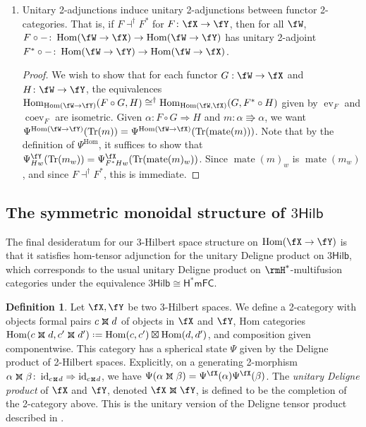 \documentclass[12pt, reqno]{amsart}
\DeclareMathOperator{\coev}{coev}
\DeclareMathOperator{\ev}{ev}
\DeclareMathOperator{\Hom}{Hom}
\DeclareMathOperator{\id}{id}
\DeclareMathOperator{\mate}{mate}
\DeclareMathOperator{\Tr}{Tr}
\newcommand{\Hilb}{\mathsf{Hilb}}
\theoremstyle{plain}
\theoremstyle{definition}
\newtheorem{defn}[thm]{Definition}
\newcommand{\coloneq}{:=}
\def\coloneq{\mathrel{\vcenter{\baselineskip0.55ex\lineskiplimit0pt\hbox{\upshape.}\hbox{\upshape.}}}=}
\newcommand{\dtimesaux}[4]{\mathbin{\vcenter{\hbox{\raisebox{#4}{\scalebox{#3}{\ooalign{\hfil$\vcenter{\hbox{$#1\times$}}$\hfil\cr\hfil$\vcenter{\hbox{\mbox{#2\upshape\wasylozenge}}}$\hfil\cr}}}}}}}
\newcommand{\dtimes}{%
  \mathchoice
    {\dtimesaux{\displaystyle}{\normalsize}{1.15}{0.35ex}}
    {\dtimesaux{\textstyle}{\normalsize}{1.15}{0.35ex}}
    {\dtimesaux{\scriptstyle}{\scriptsize}{1.0}{0ex}}
    {\dtimesaux{\scriptscriptstyle}{\tiny}{1.0}{0ex}}%
}
\newcommand{\threehilbtimes}{\dtimes}
\begin{document}
\begin{enumerate}[label=(D\arabic*)]
    \item 
    \label{D:YonedaEmbeddingUAF}
    Unitary 2-adjunctions induce unitary 2-adjunctions between functor 2-categories.
That is, if $F\dashv^\dag F^*$ for $F\colon  \fX\to \fY$, then for all $\fW$, 
$F\circ - \colon  \Hom(\fW\to \fX) \to \Hom(\fW\to \fY)$ 
has unitary 2-adjoint $F^*\circ -\colon  \Hom(\fW\to \fY)\to \Hom(\fW\to \fX)$.
\begin{proof}
We wish to show that for each functor $G:\fW \to \fX$ and $H\colon\fW \to \fY$, the equivalences $\Hom_{\Hom(\fW\to\fY)}(F\circ G,H) \cong^\dag \Hom_{\Hom(\fW,\fX)}(G,F^*\circ H)$ given by $\ev_F$ and $\coev_F$ are isometric.
Given $\alpha\colon F\circ G\Rightarrow H$ and $m\colon\alpha \Rrightarrow \alpha$, we want $\Psi^{\Hom(\fW\to\fY)}(\Tr(m)) = \Psi^{\Hom(\fW\to\fX)}(\Tr(\mate(m)))$.
Note that by the definition of $\Psi^{\Hom}$, it suffices to show that $\Psi^\fY_{Hw}(\Tr(m_w)) = \Psi^{\fX}_{F^* Hw}(\Tr(\mate(m)_w))$.
Since $\mate(m)_w$ is $\mate(m_w)$, and since $F \dashv^\dag F^*$, this is immediate.
\end{proof}
\end{enumerate}


\subsection{The symmetric monoidal structure of \texorpdfstring{$3\Hilb$}{3Hilb}}\label{sec:symm-monoidal-struct}
The final desideratum for our 3-Hilbert space structure on $\Hom(\fX\to \fY)$ is that it satisfies hom-tensor adjunction for the unitary Deligne product on $3\Hilb$, which corresponds to the usual unitary Deligne product on $\rmH^*$-multifusion categories under the equivalence $3\Hilb \cong \mathsf{H^*mFC}$.

    \begin{defn}
    Let $\fX,\fY$ be two 3-Hilbert spaces.
    We define a 2-category with objects formal pairs $c\threehilbtimes d$ of objects in $\fX$ and $\fY$, Hom categories $\Hom(c\threehilbtimes d,c'\threehilbtimes d') \coloneq \Hom(c,c')\boxtimes\Hom(d,d')$, and composition given componentwise.
    This category has a spherical state $\Psi$ given by the Deligne product of 2-Hilbert spaces.
    Explicitly, on a generating 2-morphism $\alpha\threehilbtimes \beta \colon \id_{c\threehilbtimes d} \Rightarrow \id_{c\threehilbtimes d}$, we have $\Psi(\alpha\threehilbtimes \beta) = \Psi^\fX(\alpha)\Psi^\fX(\beta)$.
    The \emph{unitary Deligne product} of $\fX$ and $\fY$, denoted $\fX\threehilbtimes \fY$, is defined to be the completion of the 2-category above. This is the unitary version of the Deligne tensor product described in \cite{MR4677193}.
    \end{defn}
    
\end{document}
